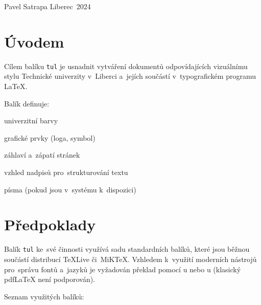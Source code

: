 \documentclass[a4paper,12pt,fonts,numbering,listingsleft]{./tulpackage/tularticle}
\newcommand{\cmdfont}[1]{\texttt{\color{\tulcolor}#1}}
\begin{document}
% 

{Pavel Satrapa}
{Liberec~2024}

\section{Úvodem}

Cílem balíku \cmdfont{tul} je usnadnit vytváření dokumentů odpovídajících
vizuálnímu stylu Technické univerzity v~Liberci a~jejích součástí
v~typografickém programu \LaTeX.

Balík definuje:

\begin{itemize*}
    \item univerzitní barvy
    \item grafické prvky (loga, symbol)
    \item záhlaví a~zápatí stránek
    \item vzhled nadpisů pro~strukturování textu
    \item písma (pokud jsou v~systému k~dispozici)
\end{itemize*}

\clearpage

\section{Předpoklady}

Balík \cmdfont{tul} ke~své činnosti využívá sadu standardních balíků, které jsou
běžnou součástí distribucí \TeX{}Live či~MiK\TeX. Vzhledem k~využití moderních
nástrojů pro~správu fontů a~jazyků je vyžadován překlad pomocí \XeLaTeX{}u nebo\linebreak
\LuaLaTeX{}u (klasický pdf\LaTeX{} není podporován).

Seznam využitých balíků:
\end{document}
